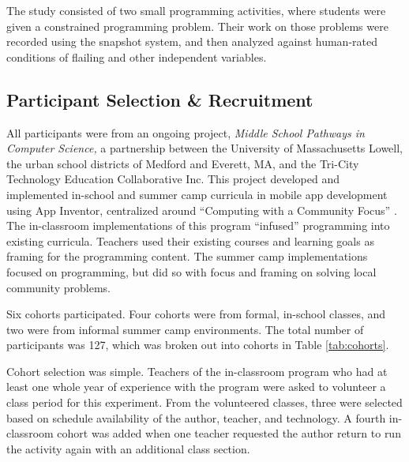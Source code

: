 The study consisted of two small programming activities, where students were given a constrained programming problem. Their work on those problems were recorded using the snapshot system, and then analyzed against human-rated conditions of flailing and other independent variables.

\subsection{Participant Selection \& Recruitment} 

All participants were from an ongoing project, \emph{Middle School Pathways in Computer Science,} a partnership between the University of Massachusetts Lowell, the urban school districts of Medford and Everett, MA, and the Tri-City Technology Education Collaborative Inc. This project developed and implemented in-school and summer camp curricula in mobile app development using App Inventor, centralized around ``Computing with a Community Focus'' \citep{Ni-2016}. The in-classroom implementations of this program ``infused'' programming into existing curricula. Teachers used their existing courses and learning goals as framing for the programming content. \label{sec:infusion} The summer camp implementations focused on programming, but did so with focus and framing on solving local community problems.

Six cohorts participated. Four cohorts were from formal, in-school classes, and two were from informal summer camp environments. The total number of participants was 127, which was broken out into cohorts in Table \ref{tab:cohorts}.

Cohort selection was simple. Teachers of the in-classroom program who had at least one whole year of experience with the program were asked to volunteer a class period for this experiment. From the volunteered classes, three were selected based on schedule availability of the author, teacher, and technology. A fourth in-classroom cohort was added when one teacher requested the author return to run the activity again with an additional class section.

